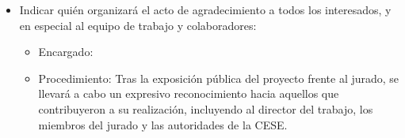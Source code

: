 \documentclass[
11pt, %
]{charter}
\begin{document}
\begin{itemize}
	\item Indicar quién organizará el acto de agradecimiento a todos los interesados, y en especial al equipo de trabajo y colaboradores:\\
    \begin{itemize}
        \item Encargado: \authorname
        \item Procedimiento: Tras la exposición pública del proyecto frente al jurado, se llevará a cabo un expresivo reconocimiento hacia aquellos que contribuyeron a su realización, incluyendo al director del trabajo, los miembros del jurado y las autoridades de la CESE.
    \end{itemize}
\end{itemize}
\end{document}
